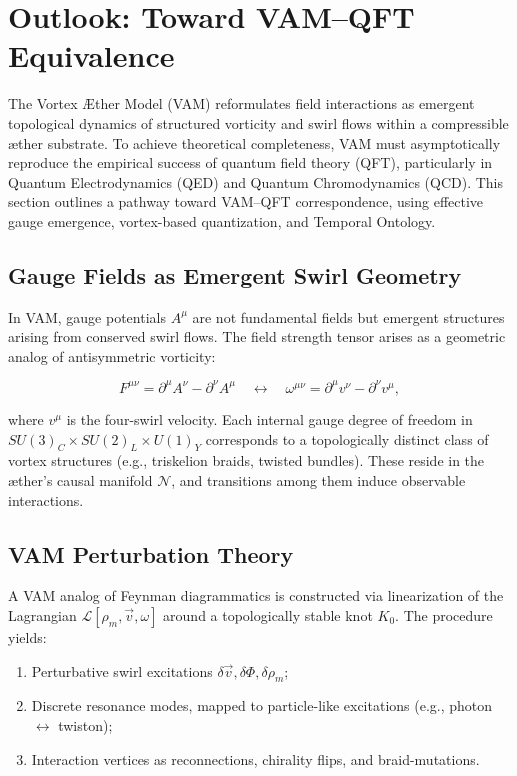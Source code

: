 \section{Outlook: Toward VAM--QFT Equivalence}
\label{sec:vam_qft_outlook}

The Vortex \AE{}ther Model (VAM) reformulates field interactions as emergent topological dynamics of structured vorticity and swirl flows within a compressible æther substrate. To achieve theoretical completeness, VAM must asymptotically reproduce the empirical success of quantum field theory (QFT), particularly in Quantum Electrodynamics (QED) and Quantum Chromodynamics (QCD). This section outlines a pathway toward VAM--QFT correspondence, using effective gauge emergence, vortex-based quantization, and Temporal Ontology.

\subsection{Gauge Fields as Emergent Swirl Geometry}

In VAM, gauge potentials \( A^\mu \) are not fundamental fields but emergent structures arising from conserved swirl flows. The field strength tensor arises as a geometric analog of antisymmetric vorticity:

\begin{equation}
F^{\mu\nu} = \partial^\mu A^\nu - \partial^\nu A^\mu
\quad \leftrightarrow \quad
\omega^{\mu\nu} = \partial^\mu v^\nu - \partial^\nu v^\mu,
\end{equation}

where \( v^\mu \) is the four-swirl velocity. Each internal gauge degree of freedom in \( SU(3)_C \times SU(2)_L \times U(1)_Y \) corresponds to a topologically distinct class of vortex structures (e.g., triskelion braids, twisted bundles). These reside in the æther's causal manifold \( \mathcal{N} \), and transitions among them induce observable interactions.

\subsection{VAM Perturbation Theory}

A VAM analog of Feynman diagrammatics is constructed via linearization of the Lagrangian \( \mathcal{L}[\rho_{\scriptscriptstyle\boldsymbol\!m}, \vec{v}, \omega] \) around a topologically stable knot \( K_0 \). The procedure yields:

\begin{enumerate}
    \item Perturbative swirl excitations \( \delta \vec{v}, \delta \Phi, \delta \rho_{\scriptscriptstyle\boldsymbol\!m} \);
    \item Discrete resonance modes, mapped to particle-like excitations (e.g., photon $\leftrightarrow$ twiston);
    \item Interaction vertices as reconnections, chirality flips, and braid-mutations.
\end{enumerate}

